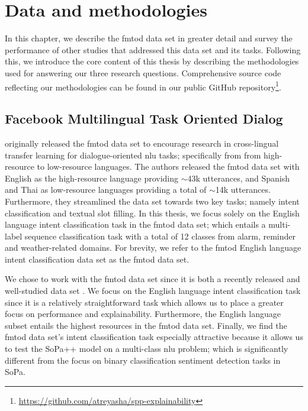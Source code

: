 \chapter{Data and methodologies}

\label{chapter:methodologies}

In this chapter, we describe the \ac{fmtod} data set in greater detail and
survey the performance of other studies that addressed this data set and its
tasks. Following this, we introduce the core content of this thesis by
describing the methodologies used for answering our three research questions.
Comprehensive source code reflecting our methodologies can be found in our
public GitHub
repository\footnote{\url{https://github.com/atreyasha/spp-explainability}}.

\section{Facebook Multilingual Task Oriented Dialog}

\citet{schuster-etal-2019-cross-lingual} originally released the \ac{fmtod} data
set to encourage research in cross-lingual transfer learning for
dialogue-oriented \ac{nlu} tasks; specifically from
from high-resource to low-resource languages. The authors released the \ac{fmtod}
data set with English as the high-resource language providing $\sim$43k
utterances, and Spanish and Thai as low-resource languages providing a total of
$\sim$14k utterances. Furthermore, they streamlined the data set towards two key
tasks; namely intent classification and textual slot filling. In this thesis, we
focus solely on the English language intent classification task in the \ac{fmtod}
data set; which entails a multi-label sequence classification task with a total
of 12 classes from alarm, reminder and weather-related domains. For brevity, we
refer to the \ac{fmtod} English language intent classification data set as the \ac{fmtod}
data set.

We chose to work with the \ac{fmtod} data set since it is both a recently released
and well-studied data set
\citep{schuster-etal-2019-cross-lingual,zhang2019joint,zhang-etal-2020-intent}.
We focus on the English language intent classification task since it is a
relatively straightforward task which allows us to place a greater focus on
performance and explainability. Furthermore, the English language subset entails
the highest resources in the \ac{fmtod} data set. Finally, we find the \ac{fmtod} data
set's intent classification task especially attractive because it allows us
to test the SoPa++ model on a multi-class \ac{nlu} problem; which is significantly
different from the focus on binary classification sentiment detection tasks in
SoPa. 

